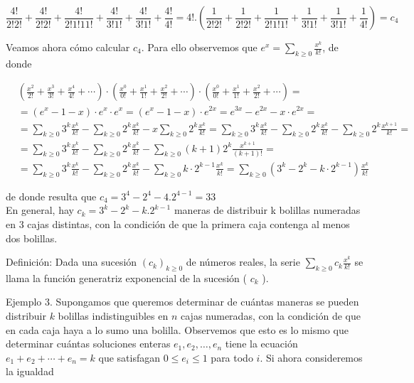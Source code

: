 \documentclass[10pt]{article}
\begin{document}
$$
\frac{4!}{2!2!}+\frac{4!}{2!2!}+\frac{4!}{2!1!11!}+\frac{4!}{3!1!}+\frac{4!}{3!1!}+\frac{4!}{4!}=4!.\left(\frac{1}{2!2!}+\frac{1}{2!2!}+\frac{1}{2!1!1!}+\frac{1}{3!1!}+\frac{1}{3!1!}+\frac{1}{4!}\right)=c_{4}
$$

Veamos ahora cómo calcular $c_{4}$. Para ello observemos que $e^{x}=\sum_{k \geq 0} \frac{x^{k}}{k!}$, de donde

$$
\begin{aligned}
& \left(\frac{x^{2}}{2!}+\frac{x^{3}}{3!}+\frac{x^{4}}{4!}+\cdots\right) \cdot\left(\frac{x^{0}}{0!}+\frac{x^{1}}{1!}+\frac{x^{2}}{2!}+\cdots\right) \cdot\left(\frac{x^{0}}{0!}+\frac{x^{1}}{1!}+\frac{x^{2}}{2!}+\cdots\right)= \\
& =\left(e^{x}-1-x\right) \cdot e^{x} \cdot e^{x}=\left(e^{x}-1-x\right) \cdot e^{2 x}=e^{3 x}-e^{2 x}-x \cdot e^{2 x}= \\
& =\sum_{k \geq 0} 3^{k} \frac{x^{k}}{k!}-\sum_{k \geq 0} 2^{k} \frac{x^{k}}{k!}-x \sum_{k \geq 0} 2^{k} \frac{x^{k}}{k!}=\sum_{k \geq 0} 3^{k} \frac{x^{k}}{k!}-\sum_{k \geq 0} 2^{k} \frac{x^{k}}{k!}-\sum_{k \geq 0} 2^{k} \frac{x^{k+1}}{k!}= \\
& =\sum_{k \geq 0} 3^{k} \frac{x^{k}}{k!}-\sum_{k \geq 0} 2^{k} \frac{x^{k}}{k!}-\sum_{k \geq 0}(k+1) 2^{k} \frac{x^{k+1}}{(k+1)!}= \\
& =\sum_{k \geq 0} 3^{k} \frac{x^{k}}{k!}-\sum_{k \geq 0} 2^{k} \frac{x^{k}}{k!}-\sum_{k \geq 0} k \cdot 2^{k-1} \frac{x^{k}}{k!}=\sum_{k \geq 0}\left(3^{k}-2^{k}-k \cdot 2^{k-1}\right) \frac{x^{k}}{k!}
\end{aligned}
$$

de donde resulta que $c_{4}=3^{4}-2^{4}-4.2^{4-1}=33$\\
En general, hay $c_{k}=3^{k}-2^{k}-k .2^{k-1}$ maneras de distribuir k bolillas numeradas en 3 cajas distintas, con la condición de que la primera caja contenga al menos dos bolillas.

Definición: Dada una sucesión $\left(c_{k}\right)_{k \geq 0}$ de números reales, la serie $\sum_{k \geq 0} c_{k} \frac{x^{k}}{k!}$ se llama la función generatriz exponencial de la sucesión ( $c_{k}$ ).

Ejemplo 3. Supongamos que queremos determinar de cuántas maneras se pueden distribuir $k$ bolillas indistinguibles en $n$ cajas numeradas, con la condición de que en cada caja haya a lo sumo una bolilla. Observemos que esto es lo mismo que determinar cuántas soluciones enteras $e_{1}, e_{2}, \ldots, e_{n}$ tiene la ecuación $e_{1}+e_{2}+\cdots+e_{n}=k$ que satisfagan $0 \leq e_{i} \leq 1$ para todo $i$. Si ahora consideremos la igualdad
\end{document}
